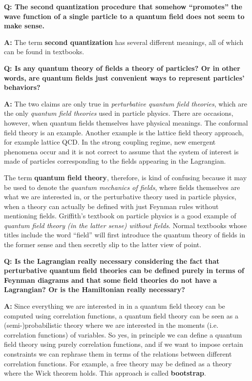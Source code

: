 \documentclass[hyperref, a4paper]{article}
\newcommand*{\concept}[1]{{\textbf{#1}}}
\newenvironment{qanda}{\setlength{\parindent}{0pt}}{\bigskip}
\newcommand{\Q}{\bigskip\bfseries Q: }
\newcommand{\A}{\par\textbf{A:} \normalfont}
\begin{document}
\begin{qanda}

\Q The second quantization procedure that somehow ``promotes'' the wave function of a single particle to a quantum field does not seem to make sense.
\A The term \concept{second quantization} has several different meanings, all of which can be found in textbooks.
    
\Q Is any quantum theory of fields a theory of particles? Or in other words, are quantum fields just convenient ways to represent particles' behaviors?
\A The two claims are only true in \emph{perturbative quantum field theories}, which are the only \emph{quantum field theories} used in particle physics.
There are occasions, however, when quantum fields themselves have physical meanings.
The conformal field theory is an example. Another example is the lattice field theory approach, for example lattice QCD.
In the strong coupling regime, new emergent phenomena occur and it is not correct to assume that the system of interest is made of particles corresponding to the fields appearing in the Lagrangian.

The term \concept{quantum field theory}, therefore, is kind of confusing because it may be used to denote the \emph{quantum mechanics of fields}, where fields themselves are what we are interested in, or the perturbative theory used in particle physics, when a theory can actually be defined with just Feynman rules without mentioning fields. 
Griffith's textbook on particle physics is a good example of \emph{quantum field theory (in the latter sense) without fields}.
Normal textbooks whose titles include the word ``field'' will first introduce the quantum theory of fields in the former sense and then secretly slip to the latter view of point.

\Q Is the Lagrangian really necessary considering the fact that perturbative quantum field theories can be defined purely in terms of Feynman diagrams and that some field theories do not have a Lagrangian? Or is the Hamiltonian really necessary?
\A Since everything we are interested in in a quantum field theory can be computed using correlation functions, a quantum field theory can be seen as a (semi-)probabilistic theory where we are interested in the moments (i.e. correlation functions) of variables.
So yes, in principle we can define a quantum field theory using purely correlation functions, and if we want to impose certain constraints we can rephrase them in terms of the relations between different correlation functions.
For example, a free theory may be defined as a theory where the Wick theorem holds.
This approach is called \concept{bootstrap}.


\end{qanda}
\end{document}
